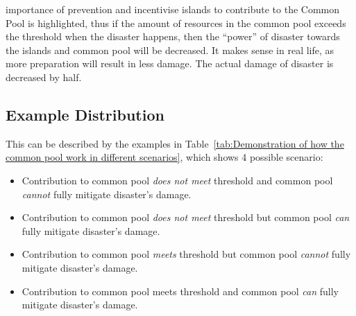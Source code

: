 importance of prevention and incentivise islands to contribute to the Common Pool is highlighted, thus if the amount of resources in the common pool exceeds the threshold when the disaster happens, then the “power” of disaster towards the islands and common pool will be decreased. It makes sense in real life, as more preparation will result in less damage. The actual damage of disaster is decreased by half.

\subsection{Example Distribution}
This can be described by the examples in Table~\ref{tab:Demonstration of how the common pool work in different scenarios}, which shows 4 possible scenario:

\begin{itemize}
    \item Contribution to common pool \textit{does not meet} threshold and common pool \textit{cannot} fully mitigate disaster’s damage.
    \item Contribution to common pool \textit{does not meet} threshold but common pool \textit{can} fully mitigate disaster’s damage.
    \item Contribution to common pool \textit{meets} threshold but common pool \textit{cannot} fully mitigate disaster’s damage.
    \item Contribution to common pool meets\textit{} threshold and common pool \textit{can} fully mitigate disaster’s damage.
\end{itemize}

